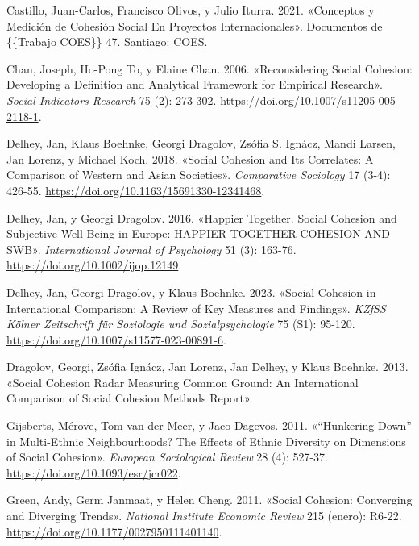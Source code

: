 \documentclass[
  letterpaper,
  DIV=11,
  numbers=noendperiod]{scrartcl}
\newlength{\cslhangindent}
\newenvironment{CSLReferences}[2] %
 {\begin{list}{}{%
  \setlength{\itemindent}{0pt}
  \setlength{\leftmargin}{0pt}
  \setlength{\parsep}{0pt}
  \ifodd #1
   \setlength{\leftmargin}{\cslhangindent}
   \setlength{\itemindent}{-1\cslhangindent}
  \fi
  \setlength{\itemsep}{#2\baselineskip}}}
 {\end{list}}
\begin{document}
\begin{CSLReferences}{1}{0}
Castillo, Juan-Carlos, Francisco Olivos, y Julio Iturra. 2021.
{«Conceptos y Medici{ó}n de Cohesi{ó}n Social En Proyectos
Internacionales»}. Documentos de \{\{Trabajo COES\}\} 47. Santiago:
COES.

Chan, Joseph, Ho-Pong To, y Elaine Chan. 2006. {«Reconsidering {Social
Cohesion}: {Developing} a {Definition} and {Analytical Framework} for
{Empirical Research}»}. \emph{Social Indicators Research} 75 (2):
273-302. \url{https://doi.org/10.1007/s11205-005-2118-1}.

Delhey, Jan, Klaus Boehnke, Georgi Dragolov, Zsófia S. Ignácz, Mandi
Larsen, Jan Lorenz, y Michael Koch. 2018. {«Social {Cohesion} and {Its
Correlates}: A {Comparison} of {Western} and {Asian Societies}»}.
\emph{Comparative Sociology} 17 (3-4): 426-55.
\url{https://doi.org/10.1163/15691330-12341468}.

Delhey, Jan, y Georgi Dragolov. 2016. {«Happier {Together}. {Social
Cohesion} and {Subjective Well-Being} in {Europe}: {HAPPIER
TOGETHER-COHESION AND SWB}»}. \emph{International Journal of Psychology}
51 (3): 163-76. \url{https://doi.org/10.1002/ijop.12149}.

Delhey, Jan, Georgi Dragolov, y Klaus Boehnke. 2023. {«Social {Cohesion}
in {International Comparison}: A {Review} of {Key Measures} and
{Findings}»}. \emph{KZfSS K{ö}lner Zeitschrift f{ü}r Soziologie und
Sozialpsychologie} 75 (S1): 95-120.
\url{https://doi.org/10.1007/s11577-023-00891-6}.

Dragolov, Georgi, Zsófia Ignácz, Jan Lorenz, Jan Delhey, y Klaus
Boehnke. 2013. {«Social {Cohesion Radar Measuring Common Ground}: {An
International Comparison} of {Social Cohesion Methods Report}»}.

Gijsberts, Mérove, Tom van der Meer, y Jaco Dagevos. 2011.
{«{``{Hunkering Down}''} in {Multi-Ethnic Neighbourhoods}? {The Effects}
of {Ethnic Diversity} on {Dimensions} of {Social Cohesion}»}.
\emph{European Sociological Review} 28 (4): 527-37.
\url{https://doi.org/10.1093/esr/jcr022}.

Green, Andy, Germ Janmaat, y Helen Cheng. 2011. {«Social {Cohesion}:
{Converging} and {Diverging Trends}»}. \emph{National Institute Economic
Review} 215 (enero): R6-22.
\url{https://doi.org/10.1177/0027950111401140}.


\end{CSLReferences}
\end{document}
